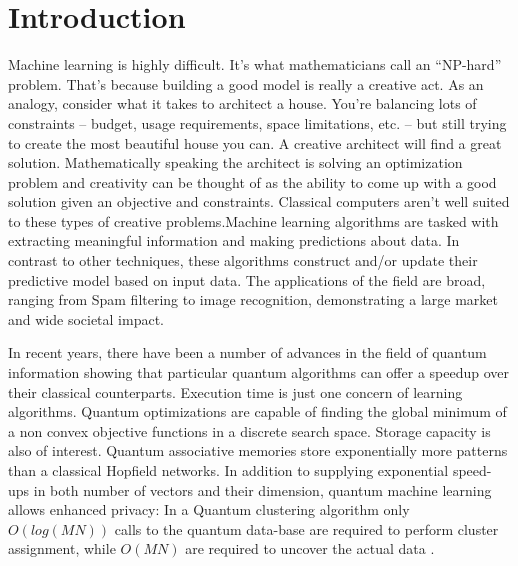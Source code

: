 \chapter{Introduction}\label{ch:introduction}

Machine learning is highly difficult. It’s what mathematicians call an “NP-hard” problem. That’s because building a good model is really a creative act. As an analogy, consider what it takes to architect a house. You’re balancing lots of constraints -- budget, usage requirements, space limitations, etc. -- but still trying to create the most beautiful house you can. A creative architect will find a great solution. Mathematically speaking the architect is solving an optimization problem and creativity can be thought of as the ability to come up with a good solution given an objective and constraints. Classical computers aren’t well suited to these types of creative problems.Machine learning algorithms are tasked with extracting meaningful information and making predictions about data. In contrast to other techniques, these algorithms construct and/or update their predictive model based on input data. The applications of the field are broad, ranging from Spam filtering to image recognition, demonstrating a large market and wide societal impact.\par\bigskip
In recent years, there have been a number of advances in the field of quantum information showing that particular quantum algorithms can offer a speedup over their classical counterparts. Execution time is just one concern of learning algorithms. Quantum optimizations are capable of finding the global minimum of a non convex objective functions in a discrete search space. Storage capacity is also of interest. Quantum associative memories store exponentially more patterns than a classical Hopfield networks. In addition to supplying exponential speed-ups in both number of vectors and their dimension, quantum machine learning allows enhanced privacy: In a Quantum clustering algorithm only $O(log(MN))$ calls to the quantum data-base are required to perform cluster assignment, while $O(MN)$ are required to uncover the actual data \cite{kmeans}.